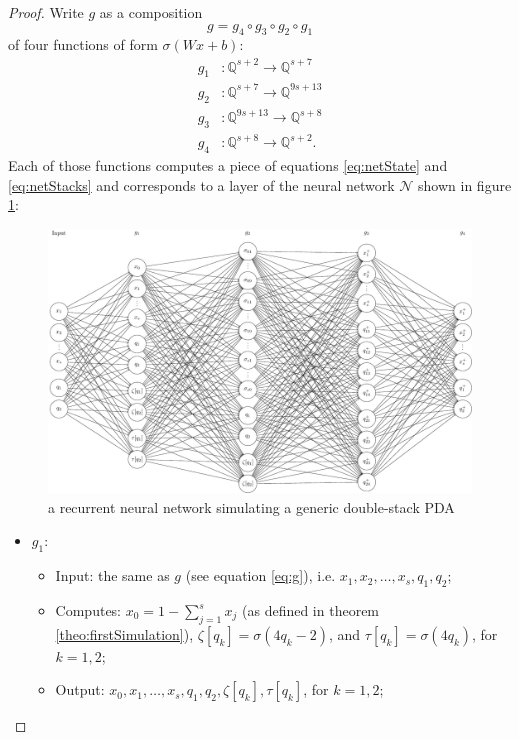 \documentclass{book}
\newcommand{\Q}{\mathbb{Q}}
\theoremstyle{definition}
\theoremstyle{plain}
\theoremstyle{plain}
\theoremstyle{remark}
\theoremstyle{plain}
\begin{document}
\begin{proof}
		Write $g$ as a composition $$g=g_4\circ g_3\circ g_2\circ g_1$$ of four functions of form $\sigma(Wx+b)$: 
		\begin{align*}
			g_1&:\Q^{s+2}\to\Q^{s+7} \\
			g_2&:\Q^{s+7}\to\Q^{9s+13} \\
			g_3&:\Q^{9s+13}\to\Q^{s+8} \\
			g_4&:\Q^{s+8}\to \Q^{s+2}.
		\end{align*}
		Each of those functions computes a piece of equations \ref{eq:netState} and \ref{eq:netStacks} and corresponds to a layer of the neural network $\mathcal{N}$ shown in figure \ref{fig:net}:
		\begin{figure}[t]
			\centering
			\includegraphics[width=\textwidth]{netImage.pdf}
			\caption{a recurrent neural network simulating a generic double-stack PDA}
			\label{fig:net}
		\end{figure}
		\begin{itemize}
			\item $g_1$: 
			\begin{itemize}
				\item Input: the same as $g$ (see equation \ref{eq:g}), i.e. $x_1,x_2,\dots,x_s,q_1,q_2$;
				\item Computes: $x_0=1-\sum_{j=1}^{s}x_j$ (as defined in theorem \ref{theo:firstSimulation}), $\zeta[q_k]=\sigma(4q_k-2)$, and $\tau[q_k]=\sigma(4q_k)$, for $k=1,2$;
				\item Output: $x_0,x_1,\dots,x_s,q_1,q_2,\zeta[q_k],\tau[q_k]$, for $k=1,2$;
			\end{itemize}
			

\end{itemize}
\end{proof}
\end{document}
